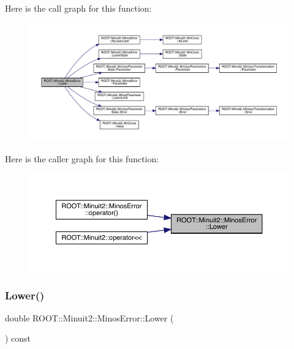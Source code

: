 Here is the call graph for this function\+:
\nopagebreak
\begin{figure}[H]
\begin{center}
\leavevmode
\includegraphics[width=350pt]{d2/dd1/classROOT_1_1Minuit2_1_1MinosError_ac412aab9b0a59a427fbe7e3cfad47f0c_cgraph}
\end{center}
\end{figure}
Here is the caller graph for this function\+:\nopagebreak
\begin{figure}[H]
\begin{center}
\leavevmode
\includegraphics[width=350pt]{d2/dd1/classROOT_1_1Minuit2_1_1MinosError_ac412aab9b0a59a427fbe7e3cfad47f0c_icgraph}
\end{center}
\end{figure}
\mbox{\label{classROOT_1_1Minuit2_1_1MinosError_ac412aab9b0a59a427fbe7e3cfad47f0c}} 
\subsubsection{\texorpdfstring{Lower()}{Lower()}\hspace{0.1cm}{\footnotesize\ttfamily [2/2]}}
{\footnotesize\ttfamily double R\+O\+O\+T\+::\+Minuit2\+::\+Minos\+Error\+::\+Lower (\begin{DoxyParamCaption}{ }\end{DoxyParamCaption}) const\hspace{0.3cm}{\ttfamily [inline]}}

